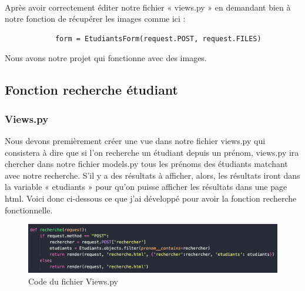 \documentclass[12pt, a4paper]{article}
\begin{document}
            \\Après avoir correctement éditer notre fichier « views.py » en demandant bien à notre fonction de récupérer les images comme ici : 
            \begin{verbatim}
            form = EtudiantsForm(request.POST, request.FILES)
            \end{verbatim}
            Nous avons notre projet qui fonctionne avec des images.
        \subsection{Fonction recherche étudiant}
            \subsubsection{Views.py}
            Nous devons premièrement créer une vue dans notre fichier views.py qui consistera à dire que si l’on recherche un étudiant depuis un prénom, views.py ira chercher dans notre fichier models.py tous les prénoms des étudiants matchant avec notre recherche. S’il y a des résultats à afficher, alors, les résultats iront dans la variable « etudiants » pour qu’on puisse afficher les résultats dans une page html. Voici donc ci-dessous ce que j’ai développé pour avoir la fonction recherche fonctionnelle. 
            \begin{figure}[h]
                \centering
                \includegraphics[width=1\textwidth]{recherche.png}
                \caption{Code du fichier Views.py}
                \label{fig:recherche}
            \end{figure}
            \newpage
\end{document}

